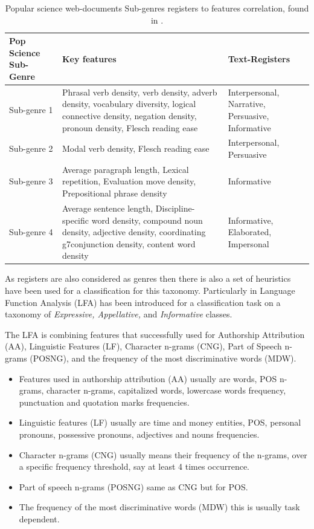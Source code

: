 \begin{table}[t]
	\center
	\caption {Popular science web-documents Sub-genres registers to features correlation, found in \parencite{lieungnapar2017genre}.}\label{chap:relevant_work:tbl:pop_science_registers_features}
	\begin{tabular}{p{4cm}p{7cm}p{3cm}}
		\hline
		Pop Science Sub-Genre & Key features & Text-Registers \\
		\hline
		 Sub-genre 1 & Phrasal verb density, verb density, adverb density, vocabulary diversity, logical connective density, negation density, pronoun density, Flesch reading ease & Interpersonal, Narrative, Persuasive, Informative \\
         Sub-genre 2 & Modal verb density, Flesch reading ease & Interpersonal, Persuasive \\
         Sub-genre 3 & Average paragraph length, Lexical repetition, Evaluation move density, Prepositional phrase density & Informative\\
         Sub-genre 4 & Average sentence length, Discipline-specific word density, compound noun density, adjective density, coordinating g7conjunction density, content word density & Informative, Elaborated, Impersonal  \\
  		\hline
	\end{tabular}
\end{table}

As registers are also considered as genres then there is also a set of heuristics have been used for a classification for this taxonomy. Particularly in \parencite{onan2018ensemble} Language Function Analysis (LFA) has been introduced for a classification task on a taxonomy of \textit{Expressive, Appellative,} and \textit{Informative} classes.

The LFA is combining features that successfully used for Authorship Attribution (AA), Linguistic Features (LF), Character n-grams (CNG), Part of Speech n-grams (POSNG), and the frequency of the most discriminative words (MDW). 

\begin{itemize}
\item Features used in authorship attribution (AA) usually are words, POS n-grams, character n-grams, capitalized words, lowercase words frequency, punctuation and quotation marks frequencies. 
\item Linguistic features (LF) usually are time and money entities, POS, personal pronouns, possessive pronouns, adjectives and nouns frequencies. 
\item Character n-grams (CNG) usually means their frequency of the n-grams, over a specific frequency threshold, say at least 4 times occurrence. 
\item Part of speech n-grams (POSNG) same as CNG but for POS.
\item The frequency of the most discriminative words (MDW) this is usually task dependent.
\end{itemize}

